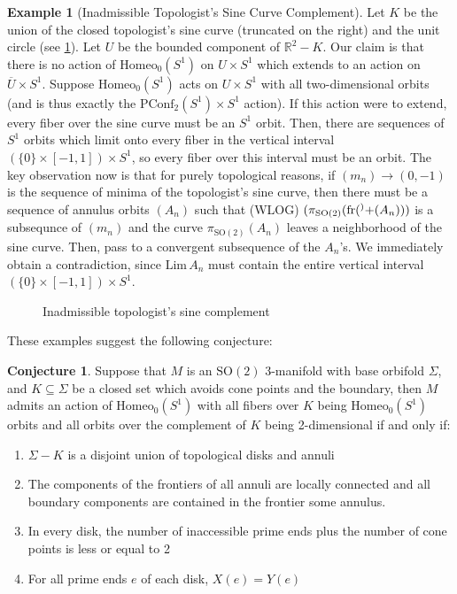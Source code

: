 \documentclass[10pt, oneside]{article}
\newcommand{\R}{\mathbb{R}}
\newcommand{\SO}[1][2]{\text{SO}(#1)}
\newcommand{\homeo}[1][S^1]{\text{Homeo}_0(#1)}
\newcommand{\cl}[1]{\overline{#1}}
\newcommand{\pconf}[2][S^1]{\text{PConf}_{#2}(#1)}
\newcommand{\klim}[1]{\text{Lim}\,#1}
\newcommand{\fr}[1]{\text{fr}(#1)}
\theoremstyle{definition}
\newtheorem{eg}{Example}[section]
\newtheorem{conj}{Conjecture}[section]
\theoremstyle{definition}
\begin{document}
\begin{eg}[Inadmissible Topologist's Sine Curve Complement]
    Let $K$ be the union of the closed topologist's sine curve (truncated on the right) and the unit circle (see \cref{fig:inadmissible-top-sin}). Let $U$ be the bounded component of $\R^2 - K$. Our claim is that there is no action of $\homeo$ on $U\times S^1$ which extends to an action on $\cl{U}\times S^1$. Suppose $\homeo$ acts on $U\times S^1$ with all two-dimensional orbits (and is thus exactly the $\pconf{2}\times S^1$ action). If this action were to extend, every fiber over the sine curve must be an $S^1$ orbit. Then, there are sequences of $S^1$ orbits which limit onto every fiber in the vertical interval $(\{0\}\times [-1, 1])\times S^1$, so every fiber over this interval must be an orbit. The key observation now is that for purely topological reasons, if $(m_n)\to (0,-1)$ is the sequence of minima of the topologist's sine curve, then there must be a sequence of annulus orbits $(A_n)$ such that (WLOG) $(\pi_{\SO}(\fr^+(A_n)))$ is a subsequnce of $(m_n)$ and the curve $\pi_{\SO}(A_n)$ leaves a neighborhood of the sine curve. Then, pass to a convergent subsequence of the $A_n$'s. We immediately obtain a contradiction, since $\klim{A_n}$ must contain the entire vertical interval $(\{0\}\times[-1, 1])\times S^1$.
\end{eg}
\begin{figure}[t]
\centering
\begin{minipage}{.5\textwidth}
    \centering
    
    \caption{Admissible spiral complement}
    \label{fig:admissible-spiral}
\end{minipage}%
\begin{minipage}{.5\textwidth}
    \centering
    
    \caption{Inadmissible topologist's sine complement}
    \label{fig:inadmissible-top-sin}
\end{minipage}
\end{figure}

These examples suggest the following conjecture:
\begin{conj}\label{conj:one-and-two-d-orbits}
    Suppose that $M$ is an $\SO$ 3-manifold with base orbifold $\Sigma$, and $K\subseteq\Sigma$ be a closed set which avoids cone points and the boundary, then $M$ admits an action of $\homeo$ with all fibers over $K$ being $\homeo$ orbits and all orbits over the complement of $K$ being 2-dimensional if and only if:
    \begin{enumerate}
        \item $\Sigma - K$ is a disjoint union of topological disks and annuli
        \item The components of the frontiers of all annuli are locally connected and all boundary components are contained in the frontier some annulus.
        \item In every disk, the number of inaccessible prime ends plus the number of cone points is less or equal to 2
        \item For all prime ends $e$ of each disk, $X(e) = Y(e)$
    \end{enumerate}
\end{conj}
\end{document}
